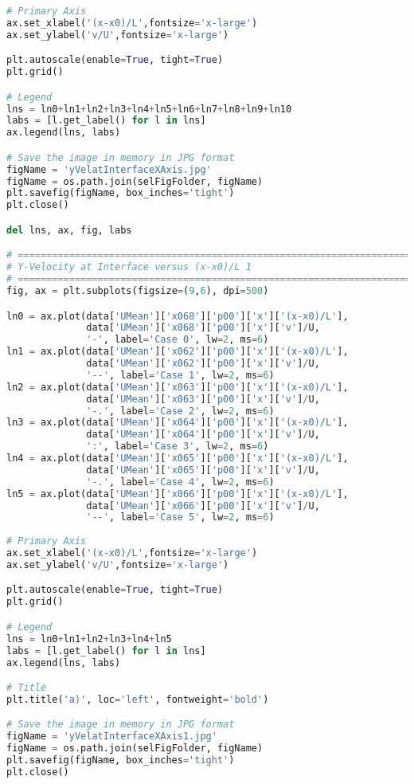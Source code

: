 \begin{lstlisting}[language=python]
# Primary Axis
ax.set_xlabel('(x-x0)/L',fontsize='x-large')
ax.set_ylabel('v/U',fontsize='x-large')

plt.autoscale(enable=True, tight=True)
plt.grid()

# Legend
lns = ln0+ln1+ln2+ln3+ln4+ln5+ln6+ln7+ln8+ln9+ln10
labs = [l.get_label() for l in lns]
ax.legend(lns, labs)

# Save the image in memory in JPG format
figName = 'yVelatInterfaceXAxis.jpg'
figName = os.path.join(selFigFolder, figName)
plt.savefig(figName, box_inches='tight')
plt.close()

del lns, ax, fig, labs

# =============================================================================
# Y-Velocity at Interface versus (x-x0)/L 1
# =============================================================================
fig, ax = plt.subplots(figsize=(9,6), dpi=500)

ln0 = ax.plot(data['UMean']['x068']['p00']['x']['(x-x0)/L'],
              data['UMean']['x068']['p00']['x']['v']/U,
              '-', label='Case 0', lw=2, ms=6)
ln1 = ax.plot(data['UMean']['x062']['p00']['x']['(x-x0)/L'],
              data['UMean']['x062']['p00']['x']['v']/U,
              '--', label='Case 1', lw=2, ms=6)
ln2 = ax.plot(data['UMean']['x063']['p00']['x']['(x-x0)/L'],
              data['UMean']['x063']['p00']['x']['v']/U,
              '-.', label='Case 2', lw=2, ms=6)
ln3 = ax.plot(data['UMean']['x064']['p00']['x']['(x-x0)/L'],
              data['UMean']['x064']['p00']['x']['v']/U,
              ':', label='Case 3', lw=2, ms=6)
ln4 = ax.plot(data['UMean']['x065']['p00']['x']['(x-x0)/L'],
              data['UMean']['x065']['p00']['x']['v']/U,
              '-.', label='Case 4', lw=2, ms=6)
ln5 = ax.plot(data['UMean']['x066']['p00']['x']['(x-x0)/L'],
              data['UMean']['x066']['p00']['x']['v']/U,
              '--', label='Case 5', lw=2, ms=6)
    
# Primary Axis
ax.set_xlabel('(x-x0)/L',fontsize='x-large')
ax.set_ylabel('v/U',fontsize='x-large')

plt.autoscale(enable=True, tight=True)
plt.grid()

# Legend
lns = ln0+ln1+ln2+ln3+ln4+ln5
labs = [l.get_label() for l in lns]
ax.legend(lns, labs)

# Title
plt.title('a)', loc='left', fontweight='bold')

# Save the image in memory in JPG format
figName = 'yVelatInterfaceXAxis1.jpg'
figName = os.path.join(selFigFolder, figName)
plt.savefig(figName, box_inches='tight')
plt.close()


\end{lstlisting}
